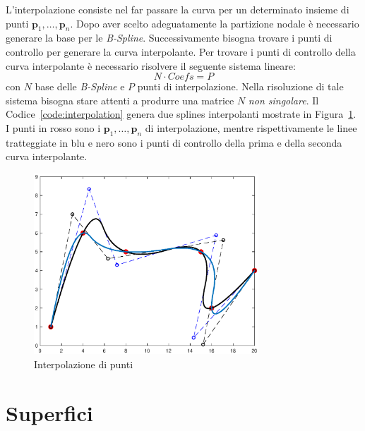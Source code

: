 \documentclass[a4paper, 12pt]{article}
\begin{document}
L'interpolazione consiste nel far passare la curva per un determinato insieme di punti $\mathbf{p}_1, \dots, \mathbf{p}_n$.
Dopo aver scelto adeguatamente la partizione nodale è necessario generare la base per le \textit{B-Spline}. Successivamente 
bisogna trovare i punti di controllo per generare la curva interpolante. 
Per trovare i punti di controllo della curva interpolante è necessario risolvere il seguente sistema lineare:
$$N \cdot Coefs = P$$
con $N$ base delle \textit{B-Spline} e $P$ punti di interpolazione. Nella risoluzione di tale sistema bisogna stare 
attenti a produrre una matrice $N$ \textit{non singolare}.
Il Codice~\ref{code:interpolation} genera due splines interpolanti mostrate in Figura~\ref{fig:interpolation}. I punti in rosso sono i   
$\mathbf{p}_1, \dots, \mathbf{p}_n$ di interpolazione, mentre 
rispettivamente le linee tratteggiate in blu e nero sono i punti di controllo della prima e della seconda curva interpolante.




\begin{figure}[]
  \centering
  \includegraphics[width=0.75\textwidth]{figure/interpolation.eps}
  \caption{Interpolazione di punti}
  \label{fig:interpolation}
\end{figure} 


\section{Superfici}
\end{document}
